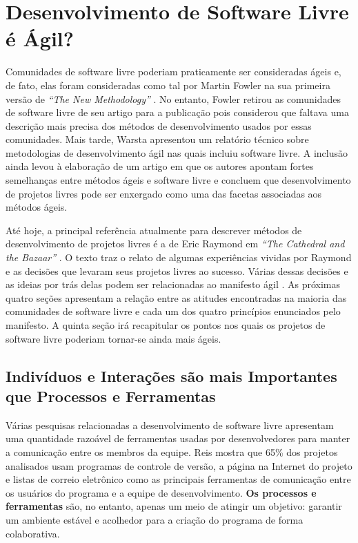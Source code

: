 \chapter{Desenvolvimento de Software Livre é Ágil?}
\label{cap:foss}

Comunidades de software livre poderiam praticamente ser consideradas
ágeis e, de fato, elas foram consideradas como tal por Martin Fowler
na sua primeira versão de \emph{``The New Methodology''}
\cite{Fowler00orig}. No entanto, Fowler retirou as comunidades de
software livre de seu artigo para a publicação pois considerou que
faltava uma descrição mais precisa dos métodos de desenvolvimento
usados por essas comunidades. Mais tarde, Warsta \cite{Warsta2002}
apresentou um relatório técnico sobre metodologias de desenvolvimento
ágil nas quais incluiu software livre. A inclusão ainda levou à
elaboração de um artigo \cite{Warsta2003} em que os autores apontam
fortes semelhanças entre métodos ágeis e software livre e concluem que
desenvolvimento de projetos livres pode ser enxergado como uma das
facetas associadas aos métodos ágeis.

Até hoje, a principal referência atualmente para descrever métodos de
desenvolvimento de projetos livres é a de Eric Raymond em \emph{``The
  Cathedral and the Bazaar''} \cite{Raymond1999}. O texto traz o
relato de algumas experiências vividas por Raymond e as decisões que
levaram seus projetos livres ao sucesso. Várias dessas decisões e as
ideias por trás delas podem ser relacionadas ao manifesto ágil
\cite{AgileManifesto}. As próximas quatro seções apresentam a relação
entre as atitudes encontradas na maioria das comunidades de software
livre e cada um dos quatro princípios enunciados pelo manifesto. A
quinta seção irá recapitular os pontos nos quais os projetos de
software livre poderiam tornar-se ainda mais ágeis.

\section{Indivíduos e Interações são mais Importantes que Processos e
  Ferramentas}
\label{sec:first-princ}

Várias pesquisas relacionadas a desenvolvimento de software livre
apresentam uma quantidade razoável de ferramentas usadas por
desenvolvedores para manter a comunicação entre os membros da
equipe. Reis \cite{Reis2003} mostra que 65\% dos projetos analisados
usam programas de controle de versão, a página na Internet do projeto
e listas de correio eletrônico como as principais ferramentas de
comunicação entre os usuários do programa e a equipe de
desenvolvimento. \textbf{Os processos e ferramentas} são, no entanto,
apenas um meio de atingir um objetivo: garantir um ambiente estável e
acolhedor para a criação do programa de forma colaborativa.

